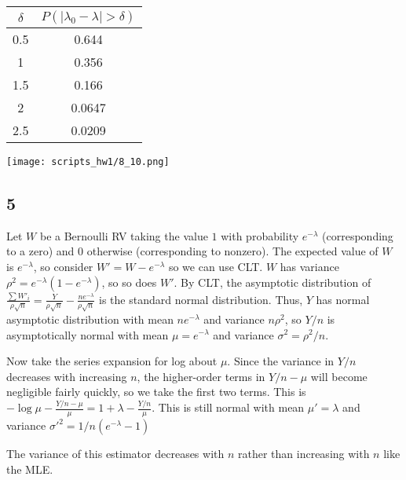 \documentclass{article}
\begin{document}
\begin{tabular}{c|c}
$\delta$ & $P(|\lambda_0-\lambda|>\delta)$\\
\hline
0.5 & 0.644\\
1 & 0.356\\
1.5 & 0.166\\
2 & 0.0647\\
2.5 & 0.0209\\
\end{tabular}

\texttt{[image: scripts\_hw1/8\_10.png]}

\subsection*{5}
Let $W$ be a Bernoulli RV taking the value $1$ with probability $e^{-\lambda}$ (corresponding to a zero) and $0$ otherwise (corresponding to nonzero). The expected value of $W$ is $e^{-\lambda}$, so consider $W'=W-e^{-\lambda}$ so we can use CLT. $W$ has variance $\rho^2=e^{-\lambda}(1-e^{-\lambda})$, so so does $W'$. By CLT, the asymptotic distribution of $\frac{\sum{W'_i}}{\rho\sqrt{n}}=\frac{Y}{\rho\sqrt{n}}-\frac{ne^{-\lambda}}{\rho\sqrt{n}}$ is the standard normal distribution. Thus, $Y$ has normal asymptotic distribution with mean $ne^{-\lambda}$ and variance $n\rho^2$, so $Y/n$ is asymptotically normal with mean $\mu=e^{-\lambda}$ and variance $\sigma^2=\rho^2/n$.

Now take the series expansion for log about $\mu$. Since the variance in $Y/n$ decreases with increasing $n$, the higher-order terms in $Y/n-\mu$ will become negligible fairly quickly, so we take the first two terms. This is $-\log\mu-\frac{Y/n-\mu}{\mu}=1+\lambda-\frac{Y/n}{\mu}$. This is still normal with mean $\mu'=\lambda$ and variance $\sigma'^2=1/n(e^{-\lambda}-1)$

The variance of this estimator decreases with $n$ rather than increasing with $n$ like the MLE. 
\end{document}
